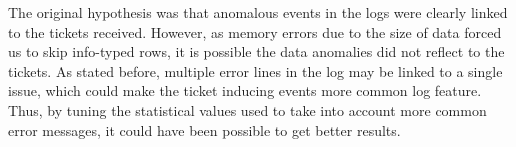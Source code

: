 The original hypothesis was
that anomalous events in the logs
were clearly linked to the tickets received.
However,
as memory errors due to the size of data forced us to skip info-typed rows,
it is possible the data anomalies did not reflect to the tickets.
As stated before,
multiple error lines in the log may be linked to a single issue,
which could make the ticket inducing events
more common log feature.
Thus,
by tuning the statistical values used
to take into account more common error messages,
it could have been possible to get better results.



\clearpage
